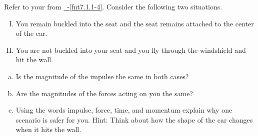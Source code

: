 \label{fnt7.1.1-6}


Refer to your \pcharts{} from \hyperref[fnt7.1.1-4]{\FNT~\thechapter-\ref{fnt7.1.1-4}}. Consider the following two situations.

\begin{enumerate}[I.]
	\item You remain buckled into the seat and the seat remains attached to the center of the car.
	\item You are not buckled into your seat and you fly through the windshield and hit the wall.
\end{enumerate}

\begin{enumerate}[(a)]
	\item Is the magnitude of the impulse the same in both cases?
	\item Are the magnitudes of the forces acting on you the same?
	\item Using the words impulse, force, time, and momentum explain why one scenario is safer for you.  Hint: Think about how the shape of the car changes when it hits the wall.
\end{enumerate}